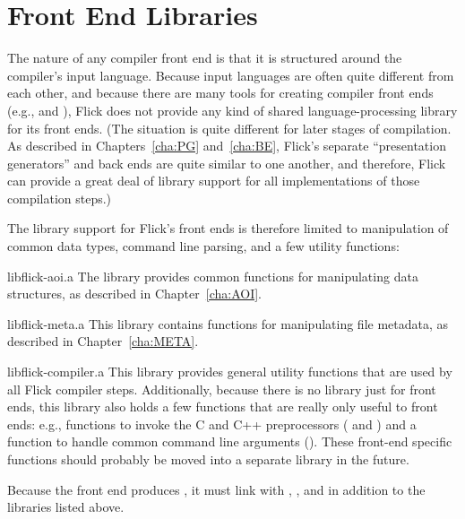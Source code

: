 

\section{Front End Libraries}
\label{sec:FE:Front End Libraries}

The nature of any compiler front end is that it is structured around the
compiler's input language.  Because input languages are often quite different
from each other, and because there are many tools for creating compiler front
ends (e.g.,  and ), Flick does not provide any kind
of shared language-processing library for its front ends.  (The situation is
quite different for later stages of \IDL{} compilation.  As described in
Chapters~\ref{cha:PG} and~\ref{cha:BE}, Flick's separate ``presentation
generators'' and back ends are quite similar to one another, and therefore,
Flick can provide a great deal of library support for all implementations of
those compilation steps.)

The library support for Flick's front ends is therefore limited to manipulation
of common data types, command line parsing, and a few utility functions:

\begin{filenamelist}
  \item[libflick-aoi.a]
  The \AOI{} library provides common functions for manipulating \AOI{} data
  structures, as described in Chapter~\ref{cha:AOI}.

  \item[libflick-meta.a]
  This library contains functions for manipulating file metadata, as described
  in Chapter~\ref{cha:META}.

  \item[libflick-compiler.a]
  This library provides general utility functions that are used by all Flick
  compiler steps.  Additionally, because there is no library just for front
  ends, this library also holds a few functions that are really only useful to
  front ends: e.g., functions to invoke the C and C++ preprocessors
  ( and ) and a
  function to handle common command line arguments
  ().  These front-end specific functions should
  probably be moved into a separate library in the future.
\end{filenamelist}

Because the \MIG{} front end produces \PRESC{}, it must link with
, , and
 in addition to the libraries listed above.

